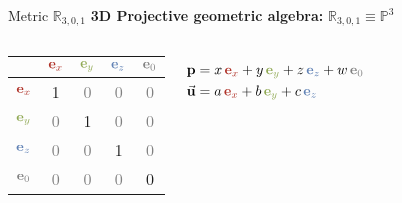 \begin{frame}{Metric $\mathbb{R}_{3,0,1}$}
    \textbf{3D Projective geometric algebra:} \quad $\mathbb{R}_{3,0,1} \equiv \mathbb{P}^3$

    \begin{columns}
        \begin{center}
            \begin{tabular}{c|cccc}
                                                  & $\textcolor{red}{\mathbf{e}_x}$ & $\textcolor{green}{\mathbf{e}_y}$ & $\textcolor{blue}{\mathbf{e}_z}$ & $\textcolor{gray}{\mathbf{e}_0}$ \\ \hline
                $\textcolor{red}{\mathbf{e}_x}$   & 1                               & \textcolor{gray}{0}               & \textcolor{gray}{0}              & \textcolor{gray}{0}              \\
                $\textcolor{green}{\mathbf{e}_y}$ & \textcolor{gray}{0}             & 1                                 & \textcolor{gray}{0}              & \textcolor{gray}{0}              \\
                $\textcolor{blue}{\mathbf{e}_z}$  & \textcolor{gray}{0}             & \textcolor{gray}{0}               & 1                                & \textcolor{gray}{0}              \\
                $\textcolor{gray}{\mathbf{e}_0}$  & \textcolor{gray}{0}             & \textcolor{gray}{0}               & \textcolor{gray}{0}              & 0                                \\
            \end{tabular}
        \end{center}

        \large
        \begin{align*}
            \mathbf{p}       & = x\,\textcolor{red}{\mathbf{e}_x} + y\,\textcolor{green}{\mathbf{e}_y} + z\,\textcolor{blue}{\mathbf{e}_z} + w\,\textcolor{gray}{\mathbf{e}_0} \\
            \vec{\mathbf{u}} & = a\,\textcolor{red}{\mathbf{e}_x} + b\,\textcolor{green}{\mathbf{e}_y} + c\,\textcolor{blue}{\mathbf{e}_z}
        \end{align*}

    \end{columns}

\end{frame}




